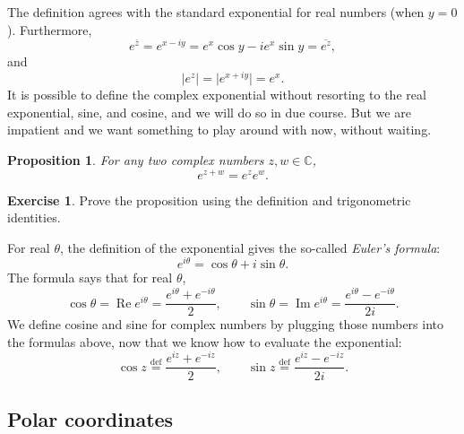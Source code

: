 \documentclass[12pt,openany]{book}
\renewcommand{\Re}{\operatorname{Re}}
\renewcommand{\Im}{\operatorname{Im}}
\newcommand{\sabs}[1]{\lvert {#1} \rvert}
\newcommand{\C}{{\mathbb{C}}}
\newcommand{\myindex}[1]{#1\index{#1}}
\theoremstyle{plain}
\newtheorem{prop}[thm]{Proposition}
\theoremstyle{remark}
\theoremstyle{definition}
\newenvironment{exbox}{%
    \def\FrameCommand{\vrule width 1pt \relax\hspace{10pt}}%
    \MakeFramed{\advance\hsize-\width\FrameRestore}%
}{%
    \endMakeFramed
}
\theoremstyle{exercise}
\newtheorem{exercise}{Exercise}[section]
\theoremstyle{example}
\begin{document}
The definition agrees with the standard exponential for real numbers (when
$y=0$).  Furthermore,
\begin{equation*}
e^{\bar{z}} = 
e^{x-iy} =
e^x\cos y - i e^x \sin y  = \overline{e^{z}} ,
\end{equation*}
and
\begin{equation*}
\sabs{e^{z}} = 
\sabs{e^{x+iy}} =
e^x .
\end{equation*}
It is possible to define the complex exponential without resorting to
the real exponential, sine, and cosine, and we will do so in due course.
But we are impatient and we want something to play around with now, without waiting.

\begin{prop}
For any two complex numbers $z,w \in \C$,
\begin{equation*}
e^{z+w} = e^z e^w .
\end{equation*}
\end{prop}

\begin{exbox}
\begin{exercise}%
Prove the proposition using the definition and trigonometric identities.
\end{exercise}
\end{exbox}

For real $\theta$, the definition
of the exponential gives the so-called
\emph{\myindex{Euler's formula}}:
\begin{equation*}
e^{i\theta}
=
\cos \theta + i \sin \theta .
\end{equation*}
The formula says that for real $\theta$,
\begin{equation*}
\cos \theta = \Re e^{i\theta} = \frac{e^{i\theta}+e^{-i\theta}}{2} ,
\qquad
\sin \theta = \Im e^{i\theta} = \frac{e^{i\theta}-e^{-i\theta}}{2i} .
\end{equation*}
We define cosine and sine for complex numbers by plugging
those numbers
into the formulas above, now that we know how to evaluate the exponential:
\begin{equation*}
\cos z \overset{\text{def}}{=} \frac{e^{iz}+e^{-iz}}{2} ,
\qquad
\sin z \overset{\text{def}}{=} \frac{e^{iz}-e^{-iz}}{2i} .
\end{equation*}

\subsection{Polar coordinates}
\end{document}
